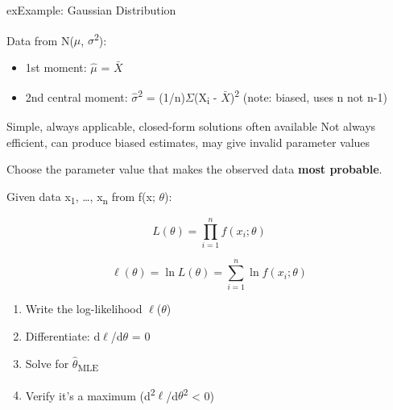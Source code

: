 \begin{PSbox}[unbreakable]{ex}{Example: Gaussian Distribution}

Data from N(\ensuremath{\mu}, \ensuremath{\sigma}\textsuperscript{2}):

\begin{itemize}
\tightlist
\item
  1st moment: \ensuremath{\hat{\mu}} = \ensuremath{\bar{X}}
\item
  2nd central moment: \ensuremath{\hat{\sigma}}\textsuperscript{2} = (1/n)\ensuremath{\Sigma}(X\textsubscript{i} - \ensuremath{\bar{X}})\textsuperscript{2} (note: biased, uses n not n-1)
\end{itemize}

\end{PSbox}


\PSyes{} Simple, always applicable, closed-form solutions often available\PSbr{}\PSno{} Not always efficient, can produce biased estimates, may give invalid parameter values



Choose the parameter value that makes the observed data \textbf{most probable}.


Given data x\textsubscript{1}, …, x\textsubscript{n} from f(x; \ensuremath{\theta}):

\[L(\theta) = \prod_{i=1}^n f(x_i; \theta)\]


\[\ell(\theta) = \ln L(\theta) = \sum_{i=1}^n \ln f(x_i; \theta)\]


\begin{enumerate}
\def\labelenumi{\arabic{enumi}.}
\tightlist
\item
  Write the log-likelihood \ensuremath{\ell}(\ensuremath{\theta})
\item
  Differentiate: d\ensuremath{\ell}/d\ensuremath{\theta} = 0
\item
  Solve for \ensuremath{\hat{\theta}}\textsubscript{MLE}
\item
  Verify it’s a maximum (d\textsuperscript{2}\ensuremath{\ell}/d\ensuremath{\theta}\textsuperscript{2} \textless{} 0)
\end{enumerate}

